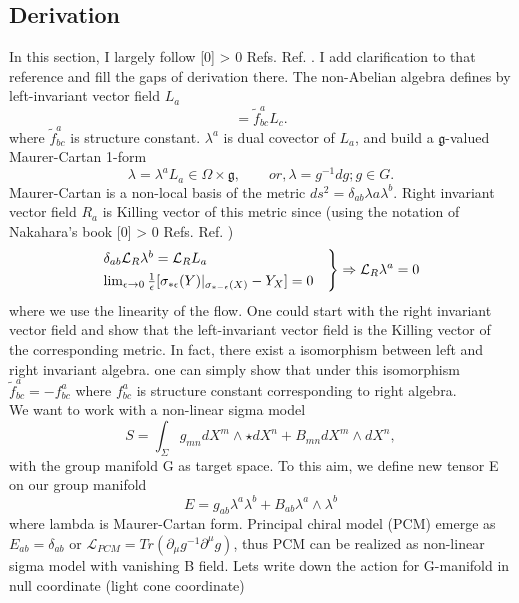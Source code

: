 \documentclass[a4paper]{article}
\renewcommand{\cite}[1]{%
\begingroup
\def\tempx{0}%
  \StrCount{#1}{,}[\tempx]%
  \ifnum\tempx > 0 
  Refs. %
  \else
  Ref. %
  \fi
\endgroup
\origcite{#1}%
}
\begin{document}
\subsection{Derivation}
In this section, I largely follow \cite{thesis}. I add clarification to that reference and fill the gaps of derivation there. The non-Abelian algebra defines by left-invariant vector field $L_a$ 
\begin{equation}
[ L_b , L_c ] = \tilde{f}^{a}_{b c} L_c. 
\end{equation}
where $\tilde{f}^{a}_{b c}$ is structure constant. $\lambda^a$ is dual covector of $L_a$, and build a $\mathfrak{g}$-valued Maurer-Cartan 1-form
\begin{equation}
\lambda = \lambda^{a} L_a \in \Omega \times \mathfrak{g}, \qquad or, \lambda = g^{-1} dg; g \in G.
\end{equation}
Maurer-Cartan is a non-local basis of the metric $ds^2= \delta_{a b} \lambda{a} \lambda^{b}$. Right invariant vector field $R_a$ is Killing vector of this metric since (using the notation of Nakahara's book \cite{nakahara} )
\begin{align}
\begin{rcases*}
\delta_{a b} \mathcal{L}_{R} \lambda^b =\mathcal{L}_{R} L_a &
\\
\lim_{\epsilon \to 0} \frac{1}{\epsilon} [ \sigma_{* \epsilon}(Y) |_{ \sigma_{*-\epsilon}(X)} -Y_X ]=0 
\end{rcases*} \Rightarrow \mathcal{L}_{R} \lambda^a = 0
\end{align}
where we use the linearity of the flow. One could start with the right invariant vector field and show that the left-invariant vector field is the Killing vector of the corresponding metric. In fact, there exist a isomorphism between left and right invariant algebra. one can simply show that under this isomorphism $\tilde{f}^{a}_{b c} = -f^{a}_{b c}$ where $f^{a}_{b c}$ is structure constant corresponding to right algebra.
\\
We want to work with a non-linear sigma model
\begin{equation}
S = \int_\Sigma g_{m n} d X^m \wedge \star d X^n + B_{m n} d X^m \wedge d X^n,
\end{equation}
with the group manifold G as target space. To this aim, we define new tensor E on our group manifold 
\begin{equation}
E = g_{a b} \lambda^{a} \lambda^{b} + B_{a b} \lambda^a \wedge \lambda^{b}
\end{equation}
where lambda is Maurer-Cartan form. Principal chiral model (PCM) emerge as $E_{a b} = \delta_{a b}$ or $\mathcal{L}_{PCM} = Tr \left(  \partial_{\mu} g^{-1} \partial^{\mu} g \right)$, thus PCM can be realized as non-linear sigma model  with vanishing B field. Lets write down the action for G-manifold in null coordinate (light cone coordinate)
\end{document}
